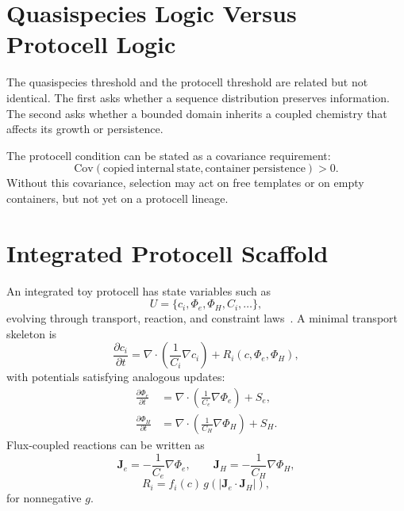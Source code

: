 \documentclass[11pt,a4paper]{article}
\begin{document}
\section{Quasispecies Logic Versus Protocell Logic}
The quasispecies threshold and the protocell threshold are related but not identical. The first asks whether a sequence distribution preserves information. The second asks whether a bounded domain inherits a coupled chemistry that affects its growth or persistence.

The protocell condition can be stated as a covariance requirement:
\begin{equation}
\mathrm{Cov}\!\left(
\mathrm{copied\ internal\ state},
\mathrm{container\ persistence}
\right)>0.
\end{equation}
Without this covariance, selection may act on free templates or on empty containers, but not yet on a protocell lineage.

\section{Integrated Protocell Scaffold}
An integrated toy protocell has state variables such as
\begin{equation}
U=\{c_i,\Phi_e,\Phi_H,C_i,\ldots\},
\end{equation}
evolving through transport, reaction, and constraint laws~\cite{SmithMorowitz2016}. A minimal transport skeleton is
\begin{equation}
\frac{\partial c_i}{\partial t}
=
\nabla\cdot\left(\frac{1}{C_i}\nabla c_i\right)
+R_i(c,\Phi_e,\Phi_H),
\end{equation}
with potentials satisfying analogous updates:
\begin{align}
\frac{\partial \Phi_e}{\partial t}
&=
\nabla\cdot\left(\frac{1}{C_e}\nabla\Phi_e\right)+S_e,\\
\frac{\partial \Phi_H}{\partial t}
&=
\nabla\cdot\left(\frac{1}{C_H}\nabla\Phi_H\right)+S_H.
\end{align}
Flux-coupled reactions can be written as
\begin{equation}
\bm{J}_e=-\frac{1}{C_e}\nabla\Phi_e,\qquad
\bm{J}_H=-\frac{1}{C_H}\nabla\Phi_H,
\end{equation}
\begin{equation}
R_i=f_i(c)\,g(|\bm{J}_e\cdot\bm{J}_H|),
\end{equation}
for nonnegative $g$.
\end{document}
